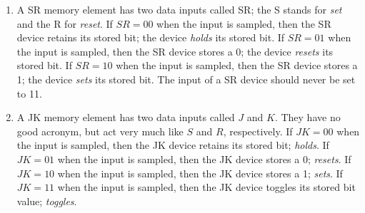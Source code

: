 \begin{changemargin}{1.5cm}{1.5cm}
\begin{enumerate}
\begin{enumerate}
                \item
                    A SR memory element has two data inputs called SR;
                    the S stands for \textit{ set} and the R for \textit{ reset}.
                    If $SR=00$ when the input is sampled, then the SR device retains
                    its stored bit; the device \textit{ holds} its stored bit.
                    If $SR=01$ when the input is sampled, then the SR device stores a 0;
                    the device \textit{ resets} its stored bit.
                    If $SR=10$ when the input is sampled, then the SR device stores a 1;
                    the device \textit{ sets} its stored bit.
                    The input of a SR device should never be set to 11.

                \item
                    A JK memory element has two data inputs called $J$ and $K$. They have
                    no good acronym, but act very much like $S$ and $R$, respectively.
                    If $JK=00$ when the input is sampled, then the JK device retains
                    its stored bit; \textit{ holds}.
                    If $JK=01$ when the input is sampled, then the JK device stores a 0; \textit{ resets}.
                    If $JK=10$ when the input is sampled, then the JK device stores a 1; \textit{ sets}.
                    If $JK=11$ when the input is sampled, then the JK device toggles its
                    stored bit value; \textit{ toggles}.
            \end{enumerate}
    \end{enumerate}
\end{changemargin}
